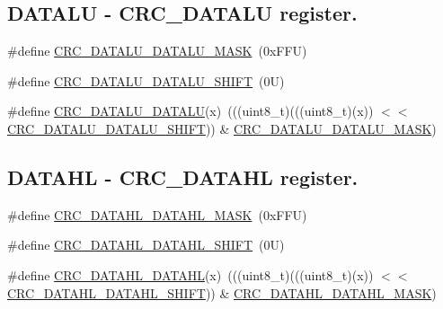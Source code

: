 \subsection*{D\+A\+T\+A\+LU -\/ C\+R\+C\+\_\+\+D\+A\+T\+A\+LU register.}
\begin{DoxyCompactItemize}
\item 
\#define \mbox{\hyperlink{group___c_r_c___register___masks_gacf86687293ecef8f5067951339146b2e}{C\+R\+C\+\_\+\+D\+A\+T\+A\+L\+U\+\_\+\+D\+A\+T\+A\+L\+U\+\_\+\+M\+A\+SK}}~(0x\+F\+F\+U)
\item 
\#define \mbox{\hyperlink{group___c_r_c___register___masks_gadb699078287075d9c73c0ececa7c11c4}{C\+R\+C\+\_\+\+D\+A\+T\+A\+L\+U\+\_\+\+D\+A\+T\+A\+L\+U\+\_\+\+S\+H\+I\+FT}}~(0\+U)
\item 
\#define \mbox{\hyperlink{group___c_r_c___register___masks_ga262be66a69987ce042fd0519e27dd682}{C\+R\+C\+\_\+\+D\+A\+T\+A\+L\+U\+\_\+\+D\+A\+T\+A\+LU}}(x)~(((uint8\+\_\+t)(((uint8\+\_\+t)(x)) $<$$<$ \mbox{\hyperlink{group___c_r_c___register___masks_gadb699078287075d9c73c0ececa7c11c4}{C\+R\+C\+\_\+\+D\+A\+T\+A\+L\+U\+\_\+\+D\+A\+T\+A\+L\+U\+\_\+\+S\+H\+I\+FT}})) \& \mbox{\hyperlink{group___c_r_c___register___masks_gacf86687293ecef8f5067951339146b2e}{C\+R\+C\+\_\+\+D\+A\+T\+A\+L\+U\+\_\+\+D\+A\+T\+A\+L\+U\+\_\+\+M\+A\+SK}})
\end{DoxyCompactItemize}
\subsection*{D\+A\+T\+A\+HL -\/ C\+R\+C\+\_\+\+D\+A\+T\+A\+HL register.}
\begin{DoxyCompactItemize}
\item 
\#define \mbox{\hyperlink{group___c_r_c___register___masks_ga7774128f4d39b06d75e221d7c058f60e}{C\+R\+C\+\_\+\+D\+A\+T\+A\+H\+L\+\_\+\+D\+A\+T\+A\+H\+L\+\_\+\+M\+A\+SK}}~(0x\+F\+F\+U)
\item 
\#define \mbox{\hyperlink{group___c_r_c___register___masks_ga76f45a4ca9734a414f5e73deb79ead0e}{C\+R\+C\+\_\+\+D\+A\+T\+A\+H\+L\+\_\+\+D\+A\+T\+A\+H\+L\+\_\+\+S\+H\+I\+FT}}~(0\+U)
\item 
\#define \mbox{\hyperlink{group___c_r_c___register___masks_ga55870105cff064737819f25ba302f07e}{C\+R\+C\+\_\+\+D\+A\+T\+A\+H\+L\+\_\+\+D\+A\+T\+A\+HL}}(x)~(((uint8\+\_\+t)(((uint8\+\_\+t)(x)) $<$$<$ \mbox{\hyperlink{group___c_r_c___register___masks_ga76f45a4ca9734a414f5e73deb79ead0e}{C\+R\+C\+\_\+\+D\+A\+T\+A\+H\+L\+\_\+\+D\+A\+T\+A\+H\+L\+\_\+\+S\+H\+I\+FT}})) \& \mbox{\hyperlink{group___c_r_c___register___masks_ga7774128f4d39b06d75e221d7c058f60e}{C\+R\+C\+\_\+\+D\+A\+T\+A\+H\+L\+\_\+\+D\+A\+T\+A\+H\+L\+\_\+\+M\+A\+SK}})
\end{DoxyCompactItemize}
